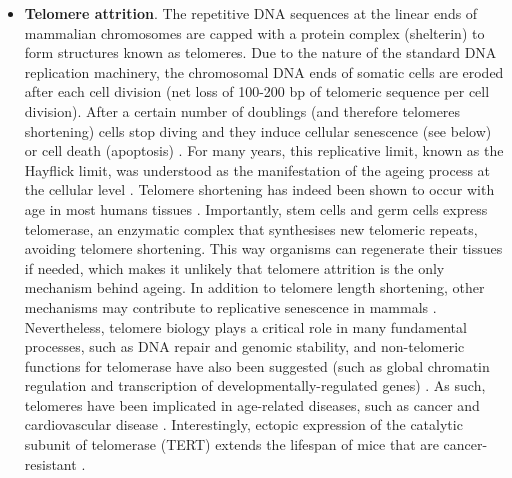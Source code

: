 \begin{itemize}
	\item \textbf{Telomere attrition}. The repetitive DNA sequences at the linear ends of mammalian chromosomes are capped with a protein complex (shelterin) to form structures known as telomeres. Due to the nature of the standard DNA replication machinery, the chromosomal DNA ends of somatic cells are eroded after each cell division (net loss of 100-200 bp of telomeric sequence per cell division). After a certain number of doublings (and therefore telomeres shortening) cells stop diving and they induce cellular senescence (see below) or cell death (apoptosis) \cite{OSullivan2010}. For many years, this replicative limit, known as the Hayflick limit, was understood as the manifestation of the ageing process at the cellular level \cite{Hayflick1961,Hayflick1998}. Telomere shortening has indeed been shown to occur with age in most humans tissues \cite{Blasco2007}. Importantly, stem cells and germ cells express telomerase, an enzymatic complex that synthesises new telomeric repeats, avoiding telomere shortening. This way organisms can regenerate their tissues if needed, which makes it unlikely that telomere attrition is the only mechanism behind ageing. In addition to telomere length shortening, other mechanisms may contribute to replicative senescence in mammals \cite{OSullivan2010}. Nevertheless, telomere biology plays a critical role in many fundamental processes, such as DNA repair and genomic stability, and non-telomeric functions for telomerase have also been suggested (such as global chromatin regulation and transcription of developmentally-regulated genes) \cite{OSullivan2010}. As such, telomeres have been implicated in age-related diseases, such as cancer and cardiovascular disease \cite{OSullivan2010,Blasco2007}. Interestingly, ectopic expression of the catalytic subunit of telomerase (TERT) extends the lifespan of mice that are cancer-resistant \cite{Tomas-Loba2008}. 
	

\end{itemize}
